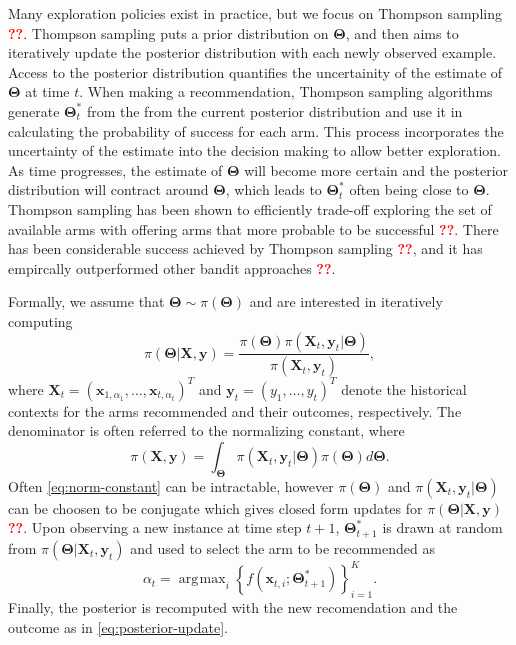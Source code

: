 \documentclass[12pt]{article}
\newcommand{\bred}[1]{\textbf{\textcolor{red}{#1}}}
\DeclareMathOperator*{\argmax}{\arg\!\max}
\begin{document}
Many exploration policies exist in practice, but we focus on Thompson sampling 
\bred{??}.
Thompson sampling puts a prior distribution on $\bm{\Theta}$, and then aims to 
iteratively update the posterior distribution with each newly observed example.
Access to the posterior distribution quantifies the uncertainity of the estimate 
of $\bm{\Theta}$ at time $t$.
When making a recommendation, Thompson sampling algorithms generate 
$\bm{\Theta}_t^*$ from the from the current posterior distribution and use it in 
calculating the probability of success for each arm.
This process incorporates the uncertainty of the estimate into the decision making 
to allow better exploration.
As time progresses, the estimate of $\bm{\Theta}$ will become more certain and
the posterior distribution will contract around $\bm{\Theta}$, which leads to 
$\bm{\Theta}_t^*$ often being close to $\bm{\Theta}$.
Thompson sampling has been shown to efficiently trade-off exploring the set of 
available arms with offering arms that more probable to be successful 
\bred{??}.
There has been considerable success achieved by Thompson sampling 
\bred{??}, and it has empircally outperformed other bandit approaches \bred{??}.

Formally, we assume that 
$\bm{\Theta} \sim \pi(\bm{\Theta})$
and are interested in iteratively computing 
\begin{equation}
\pi(\bm{\Theta} \vert \bm{X}, \bm{y})
= \frac{
    \pi(\bm{\Theta}) 
    \pi(\bm{X}_t, \bm{y}_t \vert \bm{\Theta})}
{\pi(\bm{X}_t, \bm{y}_t)},
\label{eq:posterior-update}
\end{equation}
where 
$\bm{X}_t = (\bm{x}_{1,\alpha_1}, \ldots, \bm{x}_{t,\alpha_t})^{T}$
and 
$\bm{y}_t = (y_1, \ldots, y_t)^{T}$
denote the historical contexts for the arms recommended and their outcomes, 
respectively.
The denominator is often referred to the normalizing constant, where
\begin{equation}
\pi(\bm{X}, \bm{y})
= \int_{\bm{\Theta}} 
\pi(\bm{X}_t, \bm{y}_t \vert \bm{\Theta}) 
\pi(\bm{\Theta}) 
d\bm{\Theta}.
\label{eq:norm-constant}
\end{equation}
Often \eqref{eq:norm-constant} can be intractable, however $\pi(\bm{\Theta})$
and $\pi(\bm{X}_t, \bm{y}_t \vert \bm{\Theta})$ can be choosen to be conjugate
which gives closed form updates for $\pi(\bm{\Theta} \vert \bm{X}, \bm{y})$ 
\bred{??}. 
Upon observing a new instance at time step $t + 1$, $\bm{\Theta}_{t+1}^*$ is drawn
at random from $\pi(\bm{\Theta} \vert \bm{X}_t, \bm{y}_t)$ and used to select the 
arm to be recommended as
\[
\alpha_t = \argmax_i \left\{f(\bm{x}_{t,i}; 
\bm{\Theta}_{t+1}^*)\right\}_{i = 1}^{K}.
\]
Finally, the posterior is recomputed with the new recomendation and the outcome 
as in \eqref{eq:posterior-update}.
\end{document}
